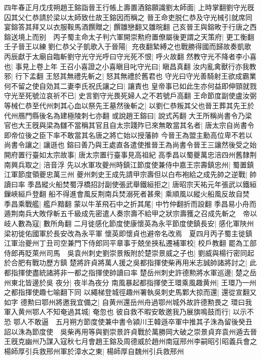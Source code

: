四年春正月戊戌朔趙王鎔詣晉王行帳上壽置酒鎔願識劉太師面|{
	上時掌翻劉守光旣囚其父仁恭請於梁以太師致仕故王鎔因而稱之}
晉王命吏脱仁恭及守光械引就席同宴鎔答其拜又以衣服鞍馬酒饌贈之|{
	饌雛戀翻又雛晥翻}
己亥晉王與鎔畋于行唐之西鎔送境上而别　丙子蜀主命太子判六軍開崇勲府置僚屬後更謂之天策府|{
	更工衡翻}
壬子晉王以練劉仁恭父子凱歌入于晉陽|{
	充夜翻縶縛之也戰勝得國而歸故奏凱歌}
丙辰獻于太廟自臨斬劉守光守光呼曰守光死不恨|{
	呼火故翻}
然教守光不降者李小喜也|{
	事見上卷上年}
王召小喜證之小喜瞋目叱守光曰|{
	瞋昌真翻}
汝内亂禽獸行亦我教邪|{
	行下孟翻}
王怒其無禮先斬之|{
	怒其無禮於舊君也}
守光曰守光善騎射王欲成霸業何不留之使自効其二妻李氏祝氏讓之曰|{
	讓責也}
皇帝事已如此生亦何益即伸頸就戮守光至死號泣哀祈不已|{
	史言劉守光畏死婦人之不若號戶高翻}
王命節度副使盧汝弼等械仁恭至代州刺其心血以祭先王墓然後斬之|{
	以劉仁恭叛其父也晉王葬其先王於代州鴈門縣後名為建極陵刺七亦翻}
或說趙王鎔曰|{
	說式芮翻}
大王所稱尚書令乃梁官也大王旣與梁為讎不當稱其官且自太宗踐阼已來無敢當其名者|{
	唐太宗自尚書令即帝位後之臣下率不敢當其名唐之將亡始以授藩帥}
今晉王為盟主勳高位卑不若以尚書令讓之|{
	讓遜也}
鎔曰善乃與王處直各遣使推晉王為尚書令晉王三讓然後受之始開府置行臺如太宗故事|{
	唐太宗置行臺事見高祖紀}
高季昌以蜀夔萬忠涪四州舊隸荆南興兵取之|{
	涪音浮}
先以水軍攻夔州時鎮江節度使兼侍中嘉王宗壽鎮忠州|{
	蜀置鎮江軍節度領夔忠萬三州}
夔州刺史王成先請甲宗壽但以白布袍給之成先帥之逆戰|{
	帥讀曰率}
季昌縱火船焚蜀浮橋招討副使張武舉鐵絙拒之|{
	唐昭宗天祐元年張武以鐵絙鏁峽絙戶登翻}
船不得進會風反荆南兵焚溺死者甚衆|{
	乘順風以縱火船風反故自焚}
季昌乘戰艦|{
	艦戶黯翻}
蒙以牛革飛石中之折其尾|{
	中竹仲翻折而設翻}
季昌易小舟而遁荆南兵大敗俘斬五千級成先密遣人奏宗壽不給甲之狀宗壽獲之召成先斬之　帝以岐人數為寇|{
	數所角翻}
二月徙感化節度使康懷英為永平節度使鎮長安|{
	感化軍陜州梁初徙佑國軍於長安改為永平軍}
懷英即懷貞也避帝名改焉　夏四月丙子蜀主徙鎮江軍治夔州丁丑司空兼門下侍郎同平章事于兢坐挾私遷補軍校|{
	校戶教翻}
罷為工部侍郎再貶萊州司馬　吳袁州刺史劉崇景叛附於楚崇景威之子也|{
	劉威與楊行密同起於合肥有戰功歷方鎮}
楚將許貞將萬人援之吳都指揮使柴再用米志誠帥諸將討之|{
	此都指揮使盡統諸將非一都之指揮使帥讀曰率}
楚岳州刺史許德勲將水軍巡邊|{
	楚之岳州東北皆邊於吳}
夜分|{
	夜半為夜分}
南風暴起都指揮使王環乘風趣黄州|{
	王環乃一州之都指揮使趣七喻翻下同}
以繩梯登城徑趣州署執吳刺史馬鄴大掠而還|{
	還從宣翻又如字}
德勲曰鄂州將邀我宜備之|{
	自黄州還岳州舟過鄂州城外故許德勲畏之}
環曰我軍入黄州鄂人不知奄過其城|{
	奄忽也}
彼自救不暇安敢邀我乃展旗鳴鼓而行|{
	以示不恐}
鄂人不敢逼　五月朔方節度使兼中書令潁川王韓遜卒軍中推其子洙為留後癸丑詔以洙為節度使　吳柴再用等與劉崇景許貞戰於萬勝岡大破之崇景貞弃袁州遁去晉王旣克幽州乃謀入寇秋七月會趙王鎔及周德威於趙州南寇邢州李嗣昭引昭義兵會之楊師厚引兵救邢州軍於漳水之東|{
	楊師厚自魏州引兵救邢州}
